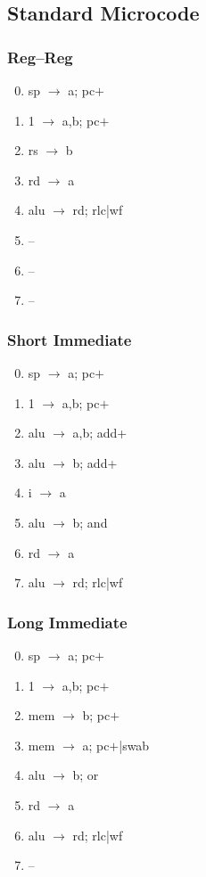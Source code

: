 \documentclass[11pt]{book}
\begin{document}
\subsection*{Standard Microcode}
\begin{multicols}{3}\ttfamily\selectfont\small
  \subsubsection*{Reg--Reg}
  \begin{enumerate}\setcounter{enumi}{-1}
  \item sp \(\rightarrow\) a; pc\(+\)
  \item 1 \(\rightarrow\) a,b; pc\(+\)
  \item rs \(\rightarrow\) b
  \item rd \(\rightarrow\) a
  \item alu \(\rightarrow\) rd; rlc|wf
  \item --
  \item --
  \item --
  \end{enumerate}
  \columnbreak
  \subsubsection*{Short Immediate}
  \begin{enumerate}\setcounter{enumi}{-1}
  \item sp \(\rightarrow\) a; pc\(+\)
  \item 1 \(\rightarrow\) a,b; pc\(+\)
  \item alu \(\rightarrow\) a,b; add+
  \item alu \(\rightarrow\) b; add+
  \item i \(\rightarrow\) a
  \item alu \(\rightarrow\) b; and
  \item rd \(\rightarrow\) a
  \item alu \(\rightarrow\) rd; rlc|wf
  \end{enumerate}
  \columnbreak
  \subsubsection*{Long Immediate}
  \begin{enumerate}\setcounter{enumi}{-1}
  \item sp \(\rightarrow\) a; pc\(+\)
  \item 1 \(\rightarrow\) a,b; pc\(+\)
  \item mem \(\rightarrow\) b; pc\(+\)
  \item mem \(\rightarrow\) a; pc\(+\)|swab
  \item alu \(\rightarrow\) b; or
  \item rd \(\rightarrow\) a
  \item alu \(\rightarrow\) rd; rlc|wf
  \item --
  \end{enumerate}
\end{multicols}
\end{document}
